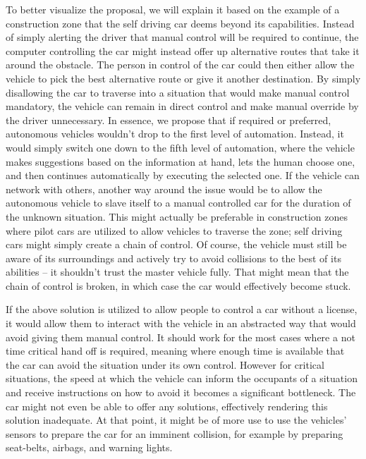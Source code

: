 \documentclass{acm_proc_article-sp}
\begin{document}
To better visualize the proposal, we will explain it based on the example of a construction zone that the self driving car deems beyond its capabilities.
Instead of simply alerting the driver that manual control will be required to continue, the computer controlling the car might instead offer up alternative routes that take it around the obstacle.
The person in control of the car could then either allow the vehicle to pick the best alternative route or give it another destination.
By simply disallowing the car to traverse into a situation that would make manual control mandatory, the vehicle can remain in direct control and make manual override by the driver unnecessary.
In essence, we propose that if required or preferred, autonomous vehicles wouldn't drop to the first level of automation.
Instead, it would simply switch one down to the fifth level of automation, where the vehicle makes suggestions based on the information at hand, lets the human choose one, and then continues automatically by executing the selected one.
If the vehicle can network with others, another way around the issue would be to allow the autonomous vehicle to slave itself to a manual controlled car for the duration of the unknown situation.
This might actually be preferable in construction zones where pilot cars are utilized to allow vehicles to traverse the zone; self driving cars might simply create a chain of control.
Of course, the vehicle must still be aware of its surroundings and actively try to avoid collisions to the best of its abilities – it shouldn't trust the master vehicle fully.
That might mean that the chain of control is broken, in which case the car would effectively become stuck.

If the above solution is utilized to allow people to control a car without a license, it would allow them to interact with the vehicle in an abstracted way that would avoid giving them manual control.
It should work for the most cases where a not time critical hand off is required, meaning where enough time is available that the car can avoid the situation under its own control.
However for critical situations, the speed at which the vehicle can inform the occupants of a situation and receive instructions on how to avoid it becomes a significant bottleneck.
The car might not even be able to offer any solutions, effectively rendering this solution inadequate.
At that point, it might be of more use to use the vehicles' sensors to prepare the car for an imminent collision, for example by preparing seat-belts, airbags, and warning lights.
\end{document}
